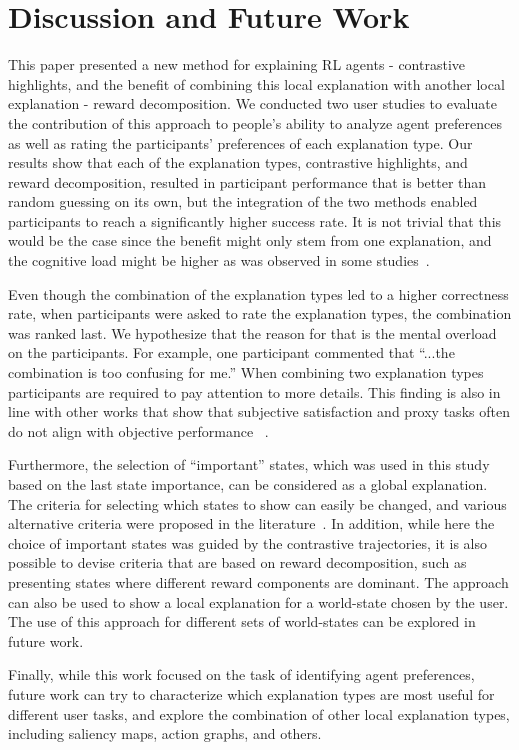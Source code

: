 \documentclass{ecai}
\begin{document}
\section{Discussion and Future Work}
This paper presented a new method for explaining RL agents - contrastive highlights, and the benefit of combining this local explanation with another local explanation - reward decomposition. We conducted two user studies to evaluate the contribution of this approach to people's ability to analyze agent preferences as well as rating the participants' preferences of each explanation type. Our results show that each of the explanation types, contrastive highlights, and reward decomposition, resulted in participant performance that is better than random guessing on its own, but the integration of the two methods enabled participants to reach a significantly higher success rate. It is not trivial that this would be the case since the benefit might only stem from one explanation, and the cognitive load might be higher as was observed in some studies~\cite{anderson2020mental}.


Even though the combination of the explanation types led to a higher correctness rate, when participants were asked to rate the explanation types, the combination was ranked last. We hypothesize that the reason for that is the mental overload on the participants. For example, one participant commented that ``...the combination is too confusing for me.''
When combining two explanation types participants are required to pay attention to more details. This finding is also in line with other works that show that subjective satisfaction and proxy tasks often do not align with objective performance ~\cite{buccinca2020proxy}.

Furthermore, the selection of ``important'' states, which was used in this study based on the last state importance, can be considered as a global explanation. The criteria for selecting which states to show can easily be changed, and various alternative criteria were proposed in the literature~\cite{lage2019exploring,huang2019enabling}. In addition, while here the choice of important states was guided by the contrastive trajectories, it is also possible to devise criteria that are based on reward decomposition, such as presenting states where different reward components are dominant. The approach can also be used to show a local explanation for a world-state chosen by the user. The use of this approach for different sets of world-states can be explored in future work.

Finally, while this work focused on the task of identifying agent preferences, future work can try to characterize which explanation types are most useful for different user tasks, and explore the combination of other local explanation types, including saliency maps, action graphs, and others.


\end{document}
